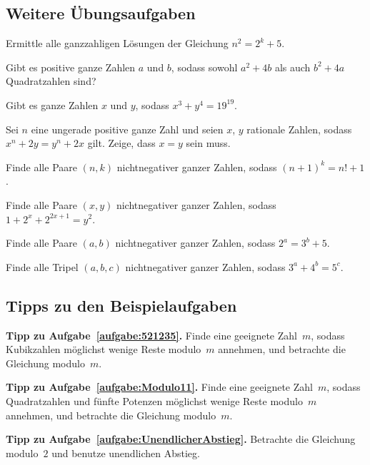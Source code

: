 \subsection*{Weitere Übungsaufgaben}
\begin{aufgabe*}\label{aufgabe:501044}
	Ermittle alle ganzzahligen Lösungen der Gleichung $n^2=2^k+5$.
\end{aufgabe*}
\begin{aufgabe*}
	Gibt es positive ganze Zahlen $a$ und $b$, sodass sowohl $a^2+4b$ als auch $b^2+4a$ Quadratzahlen sind?
\end{aufgabe*}
\begin{aufgabe*}
	Gibt es ganze Zahlen $x$ und $y$, sodass $x^3+y^4=19^{19}$.
\end{aufgabe*}
\begin{aufgabe*}
	Sei $n$ eine ungerade positive ganze Zahl und seien $x$, $y$ rationale Zahlen, sodass $x^n+2y=y^n+2x$ gilt. Zeige, dass $x=y$ sein muss.
\end{aufgabe*}
\begin{aufgabe*}[*]
	Finde alle Paare $(n,k)$ nichtnegativer ganzer Zahlen, sodass $(n+1)^k=n!+1$.
\end{aufgabe*}
\begin{aufgabe*}[*]
	Finde alle Paare $(x,y)$ nichtnegativer ganzer Zahlen, sodass $1+2^x+2^{2x+1}=y^2$.
\end{aufgabe*}
\begin{aufgabe*}[**]
	Finde alle Paare $(a,b)$ nichtnegativer ganzer Zahlen, sodass $2^a=3^b+5$.
\end{aufgabe*}
\begin{aufgabe*}[**]
	Finde alle Tripel $(a,b,c)$ nichtnegativer ganzer Zahlen, sodass $3^a+4^b=5^c$.
\end{aufgabe*}

\subsection*{Tipps zu den Beispielaufgaben}
\textbf{Tipp zu Aufgabe~\ref{aufgabe:521235}.} Finde eine geeignete Zahl~$m$, sodass Kubikzahlen möglichst wenige Reste modulo~$m$ annehmen, und betrachte die Gleichung modulo~$m$.

\textbf{Tipp zu Aufgabe~\ref{aufgabe:Modulo11}.} Finde eine geeignete Zahl~$m$, sodass Quadratzahlen und fünfte Potenzen möglichst wenige Reste modulo~$m$ annehmen, und betrachte die Gleichung modulo~$m$.

\textbf{Tipp zu Aufgabe~\ref{aufgabe:UnendlicherAbstieg}.} Betrachte die Gleichung modulo~$2$ und benutze unendlichen Abstieg.

